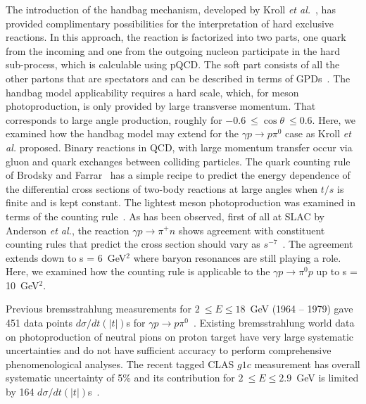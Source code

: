 \documentclass[aps,prc,twocolumn,floatfix,showpacs,preprintnumbers,amsmath,amssymb,superscriptaddress]{revtex4-1}
\begin{document}
The introduction of the handbag mechanism, 
developed by Kroll \textit{et al.}~\cite{Kroll}, has provided 
complimentary possibilities for the interpretation of hard 
exclusive reactions. In this approach, the reaction is factorized 
into two parts, one quark from the incoming and one from the 
outgoing nucleon participate in the hard sub-process, which is 
calculable using pQCD. The soft part consists of all the 
other partons that are spectators and can be described in 
terms of GPDs~\cite{HM}. The handbag model applicability 
requires a hard scale, which, for meson photoproduction, is only 
provided by large transverse momentum. That corresponds to large 
angle production, roughly
for $-0.6~\leq\cos\theta~\leq 0.6$.  Here, we examined how 
the handbag model may extend for the $\gamma p\to p\pi^0$ 
case as Kroll \textit{et al.} proposed.  
Binary reactions in QCD, with large momentum 
transfer occur via 
gluon and quark exchanges between colliding particles. The 
quark counting rule of Brodsky and 
Farrar~\cite{Stan} has a simple recipe to predict the energy 
dependence of the differential cross sections of two-body
reactions at large angles when $t/s$ is finite and is kept 
constant.  The lightest meson photoproduction was examined 
in terms of the counting rule~\cite{Anderson,Jenkins,Zhu,
Chen,Kong}. As has been observed, first of all at SLAC by 
Anderson \textit{et al.}, the reaction $\gamma p\to\pi^+n$ 
shows agreement with constituent counting rules that predict 
the cross section should vary as $s^{-7}$~\cite{Anderson}. 
The agreement extends down to s = 6~GeV$^2$ where baryon 
resonances are still playing a role.  Here, we examined how
the counting rule is applicable to the $\gamma p\to\pi^0p$ 
up to s = 10~GeV$^2$.

Previous bremsstrahlung measurements for $2~\leq E\leq 
18$~GeV (1964 -- 1979) gave 451 data points $d\sigma/dt(|t|)$s for 
$\gamma p\to p\pi^0$~\cite{brem}.  Existing bremsstrahlung 
world data on photoproduction of neutral pions on proton 
target have very large systematic uncertainties and do not 
have sufficient accuracy to perform comprehensive 
phenomenological analyses.  
The recent tagged CLAS $g1c$ 
measurement has overall systematic uncertainty of 5\% and 
its contribution for $2~\leq E\leq 2.9$~GeV is limited by 
164 $d\sigma/dt(|t|)$s~\cite{du07}.  
\end{document}
